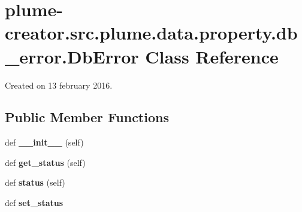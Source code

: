 \hypertarget{classplume-creator_1_1src_1_1plume_1_1data_1_1property_1_1db__error_1_1_db_error}{}\section{plume-\/creator.src.\+plume.\+data.\+property.\+db\+\_\+error.\+Db\+Error Class Reference}
\label{classplume-creator_1_1src_1_1plume_1_1data_1_1property_1_1db__error_1_1_db_error}


Created on 13 february 2016.  


\subsection*{Public Member Functions}
\begin{DoxyCompactItemize}
\item 
def {\bfseries \+\_\+\+\_\+init\+\_\+\+\_\+} (self)\hypertarget{classplume-creator_1_1src_1_1plume_1_1data_1_1property_1_1db__error_1_1_db_error_ac2e904190cc80982a019d0bc4fa10772}{}\label{classplume-creator_1_1src_1_1plume_1_1data_1_1property_1_1db__error_1_1_db_error_ac2e904190cc80982a019d0bc4fa10772}

\item 
def {\bfseries get\+\_\+status} (self)\hypertarget{classplume-creator_1_1src_1_1plume_1_1data_1_1property_1_1db__error_1_1_db_error_a31af5ef45a2e0385fa841cbd39cba6d0}{}\label{classplume-creator_1_1src_1_1plume_1_1data_1_1property_1_1db__error_1_1_db_error_a31af5ef45a2e0385fa841cbd39cba6d0}

\item 
def {\bfseries status} (self)\hypertarget{classplume-creator_1_1src_1_1plume_1_1data_1_1property_1_1db__error_1_1_db_error_aac1978d485e3bfb07bad471a08375611}{}\label{classplume-creator_1_1src_1_1plume_1_1data_1_1property_1_1db__error_1_1_db_error_aac1978d485e3bfb07bad471a08375611}

\item 
def {\bfseries set\+\_\+status}\hypertarget{classplume-creator_1_1src_1_1plume_1_1data_1_1property_1_1db__error_1_1_db_error_a2740b6f351fe6f64f40d2c0189886dd5}{}\label{classplume-creator_1_1src_1_1plume_1_1data_1_1property_1_1db__error_1_1_db_error_a2740b6f351fe6f64f40d2c0189886dd5}

\end{DoxyCompactItemize}
